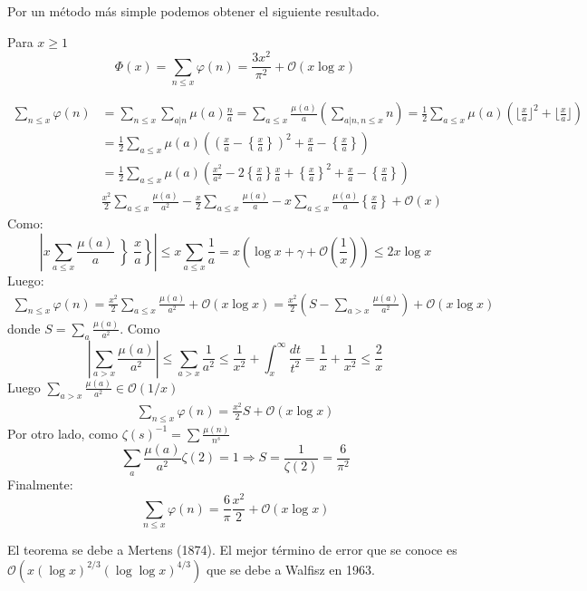 \documentclass[TAN.tex]{subfiles}
\begin{document}
Por un método más simple podemos obtener el siguiente resultado.
\begin{teorema}
Para $x≥1$
\[ Φ(x) = \sum_{n≤x} φ(n) = \frac{3x^2}{π^2} + \mathcal{O}(x\log x) \]
\end{teorema}
\begin{dem}
\begin{align*}
	\sum_{n≤x} φ(n) & = \sum_{n≤x}\sum_{a|n} μ(a) \frac{n}{a} = \sum_{a≤x} \frac{μ(a)}{a}\left(\sum_{a|n,n≤x}n\right) = \frac{1}{2} \sum_{a≤x} μ(a)\left(\lfloor \frac{x}{a}\rfloor^2 + \lfloor \frac{x}{a}\rfloor \right)\\
	& = \frac{1}{2} \sum_{a≤x} μ(a) \left(\left(\frac{x}{a} - \left\{ \frac{x}{a}\right\} \right)^2 + \frac{x}{a}-\left\{\frac{x}{a}\right\}\right)\\
	& = \frac{1}{2} \sum_{a≤x} μ(a) \left(\frac{x^2}{a^2} - 2\left\{\frac{x}{a}\right\}\frac{x}{a} + \left\{\frac{x}{a}\right\}^2+\frac{x}{a}-\left\{\frac{x}{a}\right\}\right)\\
	&  \frac{x^2}{2} \sum_{a≤x} \frac{μ(a)}{a^2} - \frac{x}{2} \sum_{a≤x} \frac{μ(a)}{a} - x \sum_{a≤x} \frac{μ(a)}{a}\left\{\frac{x}{a}\right\} + \mathcal{O}(x)
\end{align*}
Como:
\[ \left|x\sum_{a≤x} \frac{μ(a)}{a} \left\}\frac{x}{a}\right\}\right| ≤ x \sum_{a≤x} \frac{1}{a} = x (\log x + γ + \mathcal{O}\left(\frac{1}{x}\right)) ≤ 2x \log x \]
Luego:
\begin{align*}
	\sum_{n≤x} φ(n) = \frac{x^2}{2} \sum_{a≤x} \frac{μ(a)}{a^2} + \mathcal{O}(x\log x) = \frac{x^2}{2}\left(S - \sum_{a>x} \frac{μ(a)}{a^2}\right) + \mathcal{O}(x \log x)
\end{align*}
donde $S = \sum_a \frac{μ(a)}{a^2}$. Como
\[ \left|\sum_{a>x} \frac{μ(a)}{a^2}\right| ≤ \sum_{a>x} \frac{1}{a^2} ≤ \frac{1}{x^2} + \int_x^\infty \frac{dt}{t^2} = \frac{1}{x}+\frac{1}{x^2} ≤ \frac{2}{x} \]
Luego $\sum_{a>x} \frac{μ(a)}{a^2} \in \mathcal{O}(1/x)$
\begin{align*}
	\sum_{n≤x} φ(n) = \frac{x^2}{2}S + \mathcal{O}(x \log x)
\end{align*}
Por otro lado, como $ζ(s)^{-1} = \sum \frac{μ(n)}{n^s}$
\[ \sum_a \frac{μ(a)}{a^2} ζ(2) = 1 \Rightarrow S = \frac{1}{ζ(2)} = \frac{6}{π^2}\]
Finalmente:
\[ \sum_{n≤x} φ(n) = \frac{6}{π}\frac{x^2}{2} + \mathcal{O}(x\log x)\]
\end{dem}

El teorema se debe a Mertens (1874). El mejor término de error que se conoce es $\mathcal{O}(x(\log x)^{2/3}(\log \log x)^{4/3})$ que se debe a Walfisz en 1963.
\end{document}
